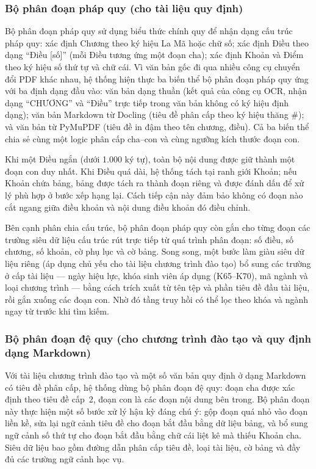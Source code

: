 \documentclass[../DoAn.tex]{subfiles}
\begin{document}
\subsubsection{Bộ phân đoạn pháp quy (cho tài liệu quy định)}

Bộ phân đoạn pháp quy sử dụng biểu thức chính quy để nhận dạng cấu trúc pháp
quy: xác định Chương theo ký hiệu La Mã hoặc chữ số; xác định Điều theo dạng
``Điều [số]'' (mỗi Điều tương ứng một đoạn cha); xác định Khoản và Điểm theo
ký hiệu số thứ tự và chữ cái. Vì văn bản gốc đi qua nhiều công cụ chuyển đổi
PDF khác nhau, hệ thống hiện thực ba biến thể bộ phân đoạn pháp quy ứng với ba
định dạng đầu vào: văn bản dạng thuần (kết quả của công cụ OCR, nhận dạng
``CHƯƠNG'' và ``Điều'' trực tiếp trong văn bản không có ký hiệu định dạng);
văn bản Markdown từ Docling (tiêu đề phân cấp theo ký hiệu thăng \#); và văn bản
từ PyMuPDF (tiêu đề in đậm theo tên chương, điều). Cả ba biến thể chia sẻ cùng
một logic phân cấp cha--con và cùng ngưỡng kích thước đoạn con.

Khi một Điều ngắn (dưới 1.000 ký tự), toàn bộ nội dung được giữ thành một đoạn
con duy nhất. Khi Điều quá dài, hệ thống tách tại ranh giới Khoản; nếu Khoản
chứa bảng, bảng được tách ra thành đoạn riêng và được đánh dấu để xử lý phù
hợp ở bước xếp hạng lại. Cách tiếp cận này đảm bảo không có đoạn nào cắt ngang
giữa điều khoản và nội dung điều khoản đó điều chỉnh.

Bên cạnh phân chia cấu trúc, bộ phân đoạn pháp quy còn gắn cho từng đoạn các
trường siêu dữ liệu cấu trúc rút trực tiếp từ quá trình phân đoạn: số điều, số
chương, số khoản, cờ phụ lục và cờ bảng. Song song, một bước làm giàu siêu dữ
liệu riêng (áp dụng chủ yếu cho tài liệu chương trình đào tạo) bổ sung các
trường ở cấp tài liệu --- ngày hiệu lực, khóa sinh viên áp dụng (K65--K70), mã
ngành và loại chương trình --- bằng cách trích xuất từ tên tệp và phần tiêu đề
đầu tài liệu, rồi gắn xuống các đoạn con. Nhờ đó tầng truy hồi có thể lọc theo
khóa và ngành ngay từ trước khi tìm kiếm.

\subsubsection{Bộ phân đoạn đệ quy (cho chương trình đào tạo và quy định dạng Markdown)}

Với tài liệu chương trình đào tạo và một số văn bản quy định ở dạng Markdown có
tiêu đề phân cấp, hệ thống dùng bộ phân đoạn đệ quy: đoạn cha được xác định
theo tiêu đề cấp~2, đoạn con là các đoạn nội dung bên trong. Bộ phân đoạn này
thực hiện một số bước xử lý hậu kỳ đáng chú ý: gộp đoạn quá nhỏ vào đoạn liền
kề, sửa lại ngữ cảnh tiêu đề cho đoạn bắt đầu bằng dữ liệu bảng, và bổ sung
ngữ cảnh số thứ tự cho đoạn bắt đầu bằng chữ cái liệt kê mà thiếu Khoản cha.
Siêu dữ liệu bao gồm đường dẫn phân cấp tiêu đề, loại tài liệu, cờ bảng và
đầy đủ các trường ngữ cảnh học vụ.
\end{document}
